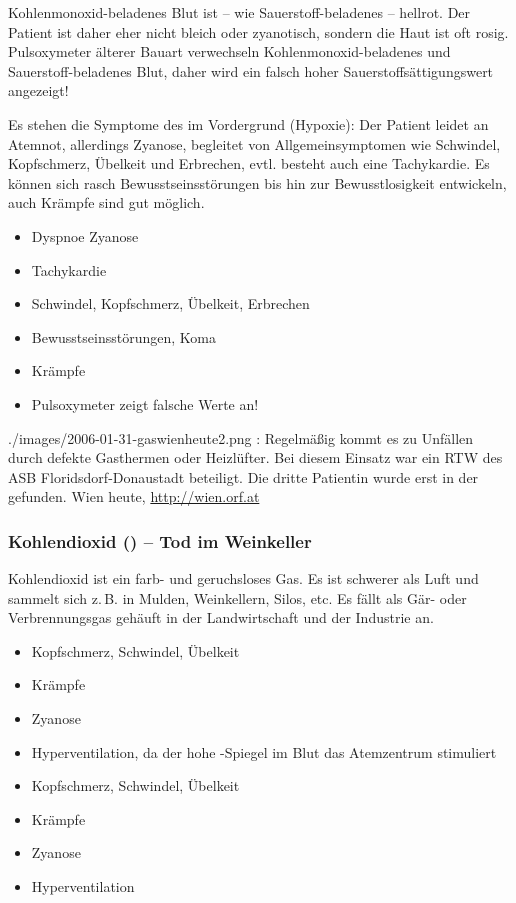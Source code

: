 {
{%
Kohlenmonoxid-beladenes Blut ist -- wie
Sauerstoff-beladenes -- hellrot. Der Patient ist daher eher
nicht bleich oder zyanotisch, sondern die Haut ist oft rosig.
Pulsoxymeter älterer Bauart verwechseln
Kohlenmonoxid-beladenes und Sauerstoff-beladenes Blut, daher
wird ein falsch hoher Sauerstoffsättigungswert angezeigt!

Es stehen die Symptome des  im
Vordergrund (Hypoxie): Der Patient leidet an Atemnot,
allerdings  Zyanose, begleitet von
Allgemeinsymptomen wie Schwindel, Kopfschmerz, Übelkeit und
Erbrechen, evtl. besteht auch eine Tachykardie.
Es können sich rasch Bewusstseinsstörungen bis hin zur
Bewusstlosigkeit entwickeln, auch Krämpfe sind gut möglich.
}{
\begin{itemize}
  \item Dyspnoe    Zyanose
  \item Tachykardie
  \item Schwindel, Kopfschmerz, Übelkeit, Erbrechen
  \item Bewusstseinsstörungen, Koma
  \item Krämpfe
  \item Pulsoxymeter zeigt falsche Werte an!
\end{itemize}
}{}{}{}

{}
{}
{}
{./images/2006-01-31-gaswienheute2.png}
{:
Regel\-mäß\-ig kommt es zu Unfällen durch defekte Gasthermen
oder Heizlüfter. Bei diesem Einsatz war ein RTW des ASB
Floridsdorf-Donaustadt beteiligt. Die dritte Patientin
wurde erst  in der
 gefunden.}
{Wien heute, \url{http://wien.orf.at}}


\subsubsection{Kohlendioxid () -- Tod im Weinkeller}


Kohlendioxid ist ein farb- und geruchsloses Gas. Es ist
schwerer als Luft und sammelt sich z.\,B. in Mulden,
Weinkellern, Silos, etc. Es fällt als Gär- oder
Verbrennungsgas gehäuft in der Landwirtschaft und der
Industrie an.


{%
\begin{itemize}
  \item Kopfschmerz, Schwindel, Übelkeit
  \item Krämpfe
  \item Zyanose
  \item Hyperventilation, da der hohe
  -Spiegel im Blut das Atemzentrum stimuliert
\end{itemize}
}{
\begin{itemize}
  \item Kopfschmerz, Schwindel, Übelkeit
  \item Krämpfe
  \item Zyanose
  \item Hyperventilation
\end{itemize}
}{}{}{}


}
